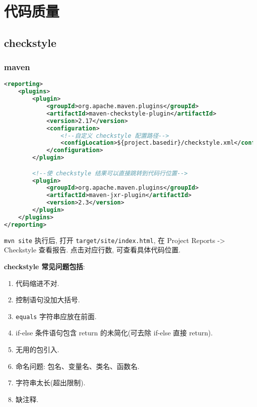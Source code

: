 \section{代码质量}\label{ux4ee3ux7801ux8d28ux91cf}

\subsection{checkstyle}\label{checkstyle}

\subsubsection{maven}\label{maven}

\begin{lstlisting}[language=XML]
<reporting>
    <plugins>
        <plugin>
            <groupId>org.apache.maven.plugins</groupId>
            <artifactId>maven-checkstyle-plugin</artifactId>
            <version>2.17</version>
            <configuration>
                <!--自定义 checkstyle 配置路径-->
                <configLocation>${project.basedir}/checkstyle.xml</configLocation>
            </configuration>
        </plugin>

        <!--使 checkstyle 结果可以直接跳转到代码行位置-->
        <plugin>
            <groupId>org.apache.maven.plugins</groupId>
            <artifactId>maven-jxr-plugin</artifactId>
            <version>2.3</version>
        </plugin>
    </plugins>
</reporting>
\end{lstlisting}

\lstinline!mvn site! 执行后, 打开 \lstinline!target/site/index.html!, 在
Project Reports -\textgreater{} Checkstyle 查看报告. 点击对应行数,
可查看具体代码位置.

\textbf{checkstyle 常见问题包括}:

\begin{enumerate}
\def\labelenumi{\arabic{enumi}.}
\tightlist
\item
  代码缩进不对.
\item
  控制语句没加大括号.
\item
  \lstinline!equals! 字符串应放在前面.
\item
  if-else 条件语句包含 return 的未简化(可去除 if-else 直接 return).
\item
  无用的包引入.
\item
  命名问题: 包名、变量名、类名、函数名.
\item
  字符串太长(超出限制).
\item
  缺注释.
\end{enumerate}

